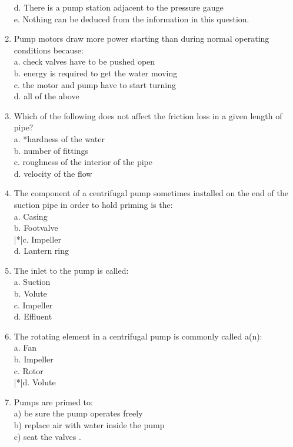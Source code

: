 \begin{enumerate}[1.]
d. There is a pump station adjacent to the pressure gauge\\
e. Nothing can be deduced from the information in this question.\\
\item Pump motors draw more power starting than during normal operating conditions because:\\
a. check valves have to be pushed open\\
b. energy is required to get the water moving\\
c. the motor and pump have to start turning\\
d. all of the above\\
\item Which of the following does not affect the friction loss in a given length of pipe?\\
a. *hardness of the water\\
b. number of fittings\\
c. roughness of the interior of the pipe\\
d. velocity of the flow\\
\item The component of a centrifugal pump sometimes installed on the end of the suction pipe in order to hold priming is the:\\
a. Casing\\
b. Footvalve\\
|*|c. Impeller\\
d. Lantern ring\\
\item The inlet to the pump is called:\\
a. Suction\\
b. Volute\\
c. Impeller\\
d. Effluent\\
\item The rotating element in a centrifugal pump is commonly called a(n):\\
a. Fan\\
b. Impeller\\
c. Rotor\\
|*|d. Volute\\
\item Pumps are primed to:\\
a) be sure the pump operates freely\\
b) replace air with water inside the pump\\
c) seat the valves .\\

\end{enumerate}
